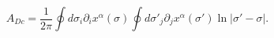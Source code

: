 \begin{equation}
\label{finalarea}
A_{Dc}=\frac{1}{2\pi}\oint d\sigma_i\partial_ix^{\alpha}(\sigma )\oint d\sigma'_j\partial_jx^{\alpha}(\sigma' )\ln |\sigma'-\sigma |.
\end{equation}

